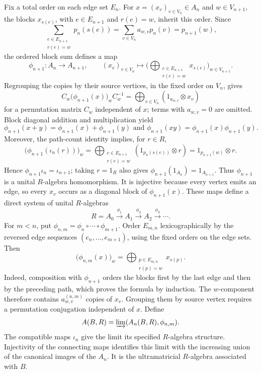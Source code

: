 \documentclass[11pt]{amsart}
\theoremstyle{definition}
\theoremstyle{remark}
\begin{document}
Fix a total order on each edge set $E_n$.
For $x=(x_v)_{v\in V_n}\in A_n$ and $w\in V_{n+1}$, the blocks
$x_{s(e)}$, with
$e\in E_{n+1}$ and $r(e)=w$, inherit this order.  Since
\[
 \sum_{\substack{e\in E_{n+1}\\r(e)=w}}p_n(s(e))
 =\sum_{v\in V_n}a_{w,v}p_n(v)=p_{n+1}(w),
\]
the ordered block sum defines a map
\begin{equation}\label{eq:bratteli-connecting-map}
 \phi_{n+1}\colon A_n \to A_{n+1},\qquad (x_v)_{v\in V_n} \mapsto
 \Bigg(\bigoplus_{\substack{e\in E_{n+1}\\r(e)=w}}x_{s(e)}\Bigg)_{w\in V_{n+1}}.
\end{equation}
Regrouping the copies by their source vertices, in the fixed order on
$V_n$, gives
\[
 C_w\bigl(\phi_{n+1}(x)\bigr)_w C_w^{-1}
 =\bigoplus_{v\in V_n}(1_{a_{w,v}}\otimes x_v)
\]
for a permutation matrix $C_w$ independent of $x$; terms with
$a_{w,v}=0$ are omitted.
Block diagonal addition and multiplication yield
\[
 \phi_{n+1}(x+y)=\phi_{n+1}(x)+\phi_{n+1}(y)\text{ and }
 \phi_{n+1}(xy)=\phi_{n+1}(x)\phi_{n+1}(y).
\]
Moreover, the path-count identity implies, for $r\in R$,
\[
 \bigl(\phi_{n+1}(\iota_n(r))\bigr)_w
 =\bigoplus_{\substack{e\in E_{n+1}\\r(e)=w}}
   (1_{p_n(s(e))}\otimes r)
 =1_{p_{n+1}(w)}\otimes r.
\]
Hence $\phi_{n+1}\iota_n=\iota_{n+1}$; taking $r=1_R$ also gives
$\phi_{n+1}(1_{A_n})=1_{A_{n+1}}$.
Thus $\phi_{n+1}$ is a unital $R$-algebra homomorphism.
It is injective because every vertex emits an edge, so every $x_v$
occurs as a diagonal block of $\phi_{n+1}(x)$.
These maps define a direct system of unital $R$-algebras
\[
 R=A_0\xrightarrow{\phi_1}A_1\xrightarrow{\phi_2}A_2
 \xrightarrow{\phi_3}\cdots.
\]
For $m<n$, put $\phi_{n,m}=\phi_n\circ\cdots\circ\phi_{m+1}$.
Order $E_{m,n}$ lexicographically by the reversed edge sequences
$(e_n,\ldots,e_{m+1})$, using the fixed orders on the edge sets.  Then
\begin{equation}\label{eq:bratteli-composite-map}
 \bigl(\phi_{n,m}(x)\bigr)_w
 =\bigoplus_{\substack{p\in E_{m,n}\\r(p)=w}}x_{s(p)}.
\end{equation}
Indeed, composition with $\phi_{n+1}$ orders the blocks first by the
last edge and then by the preceding path, which proves the formula
by induction.  The $w$-component therefore contains
$a_{w,v}^{(n,m)}$ copies of $x_v$.  Grouping them by source vertex
requires a permutation conjugation independent of $x$.
Define
\[
 A(B,R)=\varinjlim(A_n(B,R),\phi_{n,m}).
\]
The compatible maps $\iota_n$ give the limit its specified $R$-algebra
structure.  Injectivity of the connecting maps identifies this limit with the
increasing union of the canonical images of the $A_n$.
It is the ultramatricial $R$-algebra associated with $B$.
\end{document}
